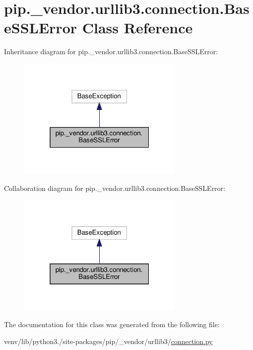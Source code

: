\hypertarget{classpip_1_1__vendor_1_1urllib3_1_1connection_1_1BaseSSLError}{}\section{pip.\+\_\+vendor.\+urllib3.\+connection.\+Base\+S\+S\+L\+Error Class Reference}
\label{classpip_1_1__vendor_1_1urllib3_1_1connection_1_1BaseSSLError}


Inheritance diagram for pip.\+\_\+vendor.\+urllib3.\+connection.\+Base\+S\+S\+L\+Error\+:
\nopagebreak
\begin{figure}[H]
\begin{center}
\leavevmode
\includegraphics[width=229pt]{classpip_1_1__vendor_1_1urllib3_1_1connection_1_1BaseSSLError__inherit__graph}
\end{center}
\end{figure}


Collaboration diagram for pip.\+\_\+vendor.\+urllib3.\+connection.\+Base\+S\+S\+L\+Error\+:
\nopagebreak
\begin{figure}[H]
\begin{center}
\leavevmode
\includegraphics[width=229pt]{classpip_1_1__vendor_1_1urllib3_1_1connection_1_1BaseSSLError__coll__graph}
\end{center}
\end{figure}


The documentation for this class was generated from the following file\+:\begin{DoxyCompactItemize}
\item 
venv/lib/python3./site-\/packages/pip/\+\_\+vendor/urllib3/\hyperlink{connection_8py}{connection.\+py}\end{DoxyCompactItemize}

